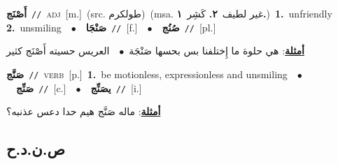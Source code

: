\documentclass[10pt,a4paper,twoside]{article} %
\begin{document}
\begin{multicols}{2}
{\setlength\topsep{0pt}\textbf{\foreignlanguage{arabic}{أَصْنَج}}\ {\color{gray}\texttt{//}\color{black}}\ \textsc{adj}\ [m.]\ (src. \color{gray}\foreignlanguage{arabic}{طولكرم}\color{black})\ \color{gray}(msa. \foreignlanguage{arabic}{غير لطيف}~\foreignlanguage{arabic}{\textbf{٢.}}  \foreignlanguage{arabic}{كَشِر}~\foreignlanguage{arabic}{\textbf{١.}})\color{black}\ \textbf{1.}~unfriendly  \textbf{2.}~unsmiling\ \ $\bullet$\ \ \setlength\topsep{0pt}\textbf{\foreignlanguage{arabic}{صَنْجَا}}\ {\color{gray}\texttt{//}\color{black}}\ [f.]\ \ $\bullet$\ \ \setlength\topsep{0pt}\textbf{\foreignlanguage{arabic}{صُنُج}}\ {\color{gray}\texttt{//}\color{black}}\ [pl.]\  \begin{flushright}\color{gray}\foreignlanguage{arabic}{\textbf{\underline{\foreignlanguage{arabic}{أمثلة}}}: هي حلوة ما إِختلفنا بس بحسها صَنْجَة\ $\bullet$\ \  العريس حسيته أَصْنَج كثير}\end{flushright}\color{black}} \vspace{2mm}

{\setlength\topsep{0pt}\textbf{\foreignlanguage{arabic}{صَنَّج}}\ {\color{gray}\texttt{//}\color{black}}\ \textsc{verb}\ [p.]\ \textbf{1.}~be motionless, expressionless and unsmiling\ \ $\bullet$\ \ \setlength\topsep{0pt}\textbf{\foreignlanguage{arabic}{صَنِّج}}\ {\color{gray}\texttt{//}\color{black}}\ [c.]\ \ $\bullet$\ \ \setlength\topsep{0pt}\textbf{\foreignlanguage{arabic}{يصَنِّج}}\ {\color{gray}\texttt{//}\color{black}}\ [i.]\  \begin{flushright}\color{gray}\foreignlanguage{arabic}{\textbf{\underline{\foreignlanguage{arabic}{أمثلة}}}: ماله صَنَّج هيم حدا دعس عذنبه؟}\end{flushright}\color{black}} \vspace{2mm}

\vspace{-3mm}
\subsection*{\color{blue}\foreignlanguage{arabic}{ص.ن.د.ح}\color{blue}{}} 


\end{multicols}
\end{document}
